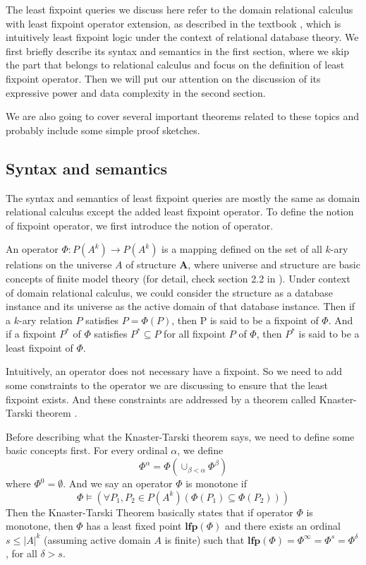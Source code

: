 The least fixpoint queries we discuss here refer to the domain relational calculus with least fixpoint operator extension, as described in the textbook \cite{Abiteboul1}, which is intuitively least fixpoint logic under the context of relational database theory. We first briefly describe its syntax and semantics in the first section, where we skip the part that belongs to relational calculus and focus on the definition of least fixpoint operator. Then we will put our attention on the discussion of its expressive power and data complexity in the second section. 

We are also going to cover several important theorems related to these topics and probably include some simple proof sketches.

\subsection{Syntax and semantics}
The syntax and semantics of least fixpoint queries are mostly the same as domain relational calculus except the added least fixpoint operator. To define the notion of fixpoint operator, we first introduce the notion of operator.

An operator $\Phi: \textit{P}(A^k)\rightarrow \textit{P}(A^k)$ is a mapping defined on the set of all $k$-ary relations on the universe $A$ of structure $\textbf{A}$, where universe and structure are basic concepts of finite model theory (for detail, check section 2.2 in \cite{kolaitis1}). Under context of domain relational calculus, we could consider the structure as a database instance and its universe as the active domain of that database instance. Then if a $k$-ary relation $P$ satisfies $P=\Phi(P)$, then P is said to be a fixpoint of $\Phi$. And if a fixpoint $P^*$ of $\Phi$ satisfies $P^*\subseteq P$ for all fixpoint $P$ of $\Phi$, then $P^*$ is said to be a least fixpoint of $\Phi$.

Intuitively, an operator does not necessary have a fixpoint. So we need to add some constraints to the operator we are discussing to ensure that the least fixpoint exists. And these constraints are addressed by a theorem called Knaster-Tarski theorem \cite{Tarski}. 

Before describing what the Knaster-Tarski theorem says, we need to define some basic concepts first. For every ordinal $\alpha$, we define 
$$\Phi^{\alpha}=\Phi(\cup_{\beta<\alpha} \Phi^{\beta})$$
where $\Phi^0=\emptyset$. And we say an operator $\Phi$ is monotone if 
$$\Phi\models(\forall P_1,P_2\in P(A^k)(\Phi(P_1)\subseteq\Phi(P_2)))$$
Then the Knaster-Tarski Theorem basically states that if operator $\Phi$ is monotone, then $\Phi$ has a least fixed point $\textbf{lfp}(\Phi)$ and there exists an ordinal $s\leq |A|^k$ (assuming active domain $A$ is finite) such that $\textbf{lfp}(\Phi)=\Phi^{\infty}=\Phi^s=\Phi^{\delta}$, for all $\delta > s$.

